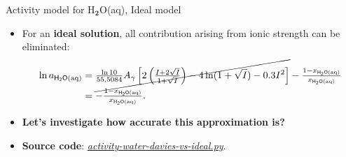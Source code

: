 %
\begin{frame}{Activity model for H$_{\boldsymbol{2}}$O(aq),  Ideal model}
\begin{itemize}[<+->]
\item For an \alert{\textbf{ideal solution}}, all contribution arising from ionic strength
can be eliminated:
\begin{alignat*}{2}
\ln a_{\mathsf{H_{2}O\text{(aq)}}} 
& =\cancel{\tfrac{\ln10}{55.5084}A_{\gamma}\left[2\left(\tfrac{I+2\sqrt{I}}{1+\sqrt{I}}\right)-4\ln(1+\sqrt{I})-0.3I^{2}\right]}-\tfrac{1-x_{\mathsf{\mathsf{H_{2}O\text{(aq)}}}}}{x_{\mathsf{\mathsf{H_{2}O\text{(aq)}}}}} \\ 
&=-\tfrac{1-x_{\mathsf{\mathsf{H_{2}O\text{(aq)}}}}}{x_{\mathsf{\mathsf{H_{2}O\text{(aq)}}}}}.
\end{alignat*}
\item \textbf{Let's investigate how accurate this approximation is?} 
\item \textbf{Source code}: \href{https://polybox.ethz.ch/index.php/s/cAmnV8dKZH7AMcK}{\textcolor{indigo(dye)}{\it activity-water-davies-vs-ideal.py}}.
\end{itemize}
\end{frame}
%
%

